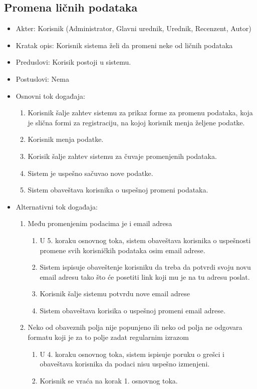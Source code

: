 \documentclass[a4paper]{article}
\begin{document}
\subsection{Promena ličnih podataka}
\begin{itemize}
    \item Akter: Korisnik (Administrator, Glavni urednik, Urednik, Recenzent, Autor)
    \item Kratak opis: Korisnik sistema želi da promeni neke od ličnih podataka
    \item Preduslovi: Korisik postoji u sistemu.
    \item Postuslovi: Nema
    \item Osnovni tok događaja:
        \begin{enumerate}
            \item Korisnik šalje zahtev sistemu za prikaz forme za promenu podataka, koja je slična formi za registraciju, na kojoj korisnik menja željene podatke.
            \item Korisnik menja podatke.
            \item Korisik šalje zahtev sistemu za čuvaje promenjenih podataka.
            \item Sistem je uspešno sačuvao nove podatke.
            \item Sistem obaveštava korisnika o uspešnoj promeni podataka.
        \end{enumerate}
    \item Alternativni tok događaja:
        \begin{enumerate}
            \item Među promenjenim podacima je i email adresa
                \begin{enumerate}
                    \item U 5. koraku osnovnog toka, sistem obaveštava korisnika o uspešnosti promene svih korisničkih podataka osim email adrese.
                    \item Sistem ispisuje obaveštenje korisniku da treba da potvrdi svoju novu email adresu tako što će posetiti link koji mu je na tu adresu poslat.
                    \item Korisnik šalje sistemu potvrdu nove email adrese
                    \item Sistem obaveštava korisika o uspešnoj promeni email adrese.
                \end{enumerate}
            \item Neko od obaveznih polja nije popunjeno ili neko od polja ne odgovara formatu koji je za to polje zadat regularnim izrazom
                \begin{enumerate}
                    \item U 4. koraku osnovnog toka, sistem ispisuje poruku o grešci i obaveštava korisnika da podaci nisu uspešno izmenjeni.
                    \item Korisnik se vraća na korak 1. osnovnog toka.
                \end{enumerate}
        \end{enumerate}
\end{itemize}
\end{document}
